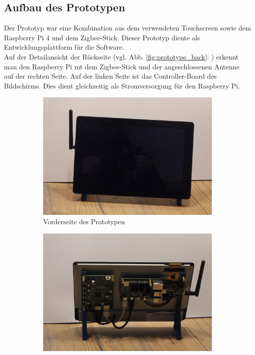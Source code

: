 \subsection{Aufbau des Prototypen}\label{hw_prototype}
Der Prototyp war eine Kombination aus dem verwendeten Touchscreen sowie dem Raspberry Pi 4 und dem Zigbee-Stick. 
Dieser Prototyp diente als Entwicklungsplattform für die Software.\\
\noindent Auf der Detailansicht der Rückseite (vgl. Abb. \ref{fig:prototype_back}: ) erkennt man den Raspberry Pi mt dem Zigbee-Stick und der angeschlossenen Antenne auf der rechten Seite.
Auf der linken Seite ist das Controller-Board des Bildschirms.
Dies dient gleichzeitig als Stromversorgung für den Raspberry Pi.
\begin{figure}[H]
	\begin{subfigure}[b]{0.5\linewidth}
		\includegraphics[width=1\textwidth]{img/prototype_front.png}
		\caption[Vorderseite des Prototypen]{Vorderseite des Prototypen}
	\end{subfigure}
	\begin{subfigure}[b]{0.5\linewidth}
		\includegraphics[width=1\textwidth]{img/prototype_back.png}

\end{subfigure}
\end{figure}
